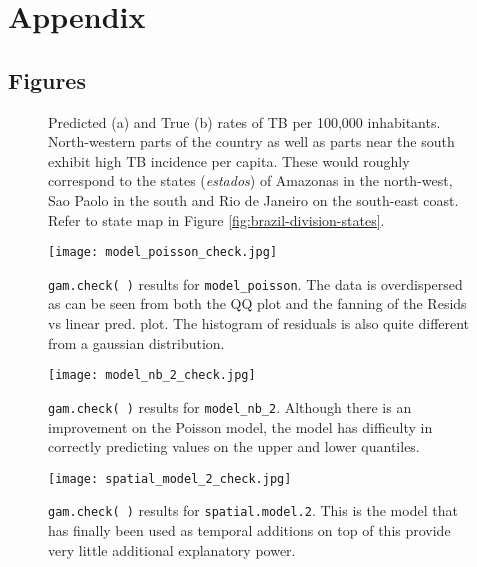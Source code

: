 
\section{Appendix}

\subsection{Figures}

\begin{figure}[H]
	\centering
	\qquad
	\caption{Predicted (a) and True (b) rates of TB per 100,000 inhabitants. North-western parts of the country as well as parts near the south exhibit high TB incidence per capita. These would roughly correspond to the states (\textit{estados}) of Amazonas in the north-west, Sao Paolo in the south and Rio de Janeiro on the south-east coast. Refer to state map in Figure \ref{fig:brazil-division-states}.}%
	\label{fig:pred_TB_rate_map}%
\end{figure}

\begin{figure}[H]
\centering
\texttt{[image: model\_poisson\_check.jpg]}
\caption{\label{fig:model_poisson_check}\texttt{gam.check( )} results for \texttt{model\_poisson}. The data is overdispersed as can be seen from both the QQ plot and the fanning of the Resids vs linear pred. plot. The histogram of residuals is also quite different from a gaussian distribution.}
\end{figure}

\begin{figure}[H]
\centering
\texttt{[image: model\_nb\_2\_check.jpg]}
\caption{\label{fig:model_nb_2_check}\texttt{gam.check( )} results for \texttt{model\_nb\_2}. Although there is an improvement on the Poisson model, the model has difficulty in correctly predicting values on the upper and lower quantiles.}
\end{figure}

\begin{figure}[H]
\centering
\texttt{[image: spatial\_model\_2\_check.jpg]}
\caption{\label{fig:spatial_model_2_check}\texttt{gam.check( )} results for \texttt{spatial.model.2}. This is the model that has finally been used as temporal additions on top of this provide very little additional explanatory power.}
\end{figure}


